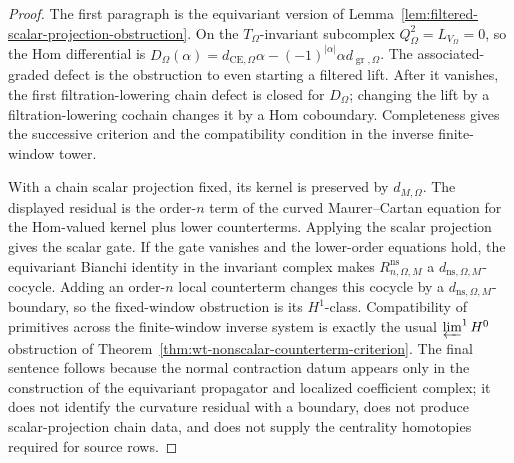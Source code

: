 \begin{proof}
  The first paragraph is the equivariant version of
  Lemma~\ref{lem:filtered-scalar-projection-obstruction}.  On the
  \(T_\Omega\)-invariant subcomplex \(Q_\Omega^2=L_{V_\Omega}=0\), so the
  Hom differential is
  \(D_\Omega(\alpha)=d_{\mathrm{CE},\Omega}\alpha
  -(-1)^{|\alpha|}\alpha d_{\operatorname{gr},\Omega}\).  The
  associated-graded defect is the obstruction to even starting a filtered
  lift.  After it vanishes, the first filtration-lowering chain defect is
  closed for \(D_\Omega\); changing the lift by a filtration-lowering
  cochain changes it by a Hom coboundary.  Completeness gives the
  successive criterion and the compatibility condition in the inverse
  finite-window tower.

  With a chain scalar projection fixed, its kernel is preserved by
  \(d_{M,\Omega}\).  The displayed residual is the order-\(n\) term of the
  curved Maurer--Cartan equation for the Hom-valued kernel plus lower
  counterterms.  Applying the scalar projection gives the scalar gate.  If
  the gate vanishes and the lower-order equations hold, the equivariant
  Bianchi identity in the invariant complex makes
  \(R^{\mathrm{ns}}_{n,\Omega,M}\) a
  \(d_{\mathrm{ns},\Omega,M}\)-cocycle.  Adding an order-\(n\) local
  counterterm changes this cocycle by a
  \(d_{\mathrm{ns},\Omega,M}\)-boundary, so the fixed-window obstruction
  is its \(H^1\)-class.  Compatibility of primitives across the
  finite-window inverse system is exactly the usual
  \(\varprojlim^1H^0\) obstruction of
  Theorem~\ref{thm:wt-nonscalar-counterterm-criterion}.  The final
  sentence follows because the normal contraction datum appears only in
  the construction of the equivariant propagator and localized coefficient
  complex; it does not identify the curvature residual with a boundary,
  does not produce scalar-projection chain data, and does not supply the
  centrality homotopies required for source rows.
\end{proof}

